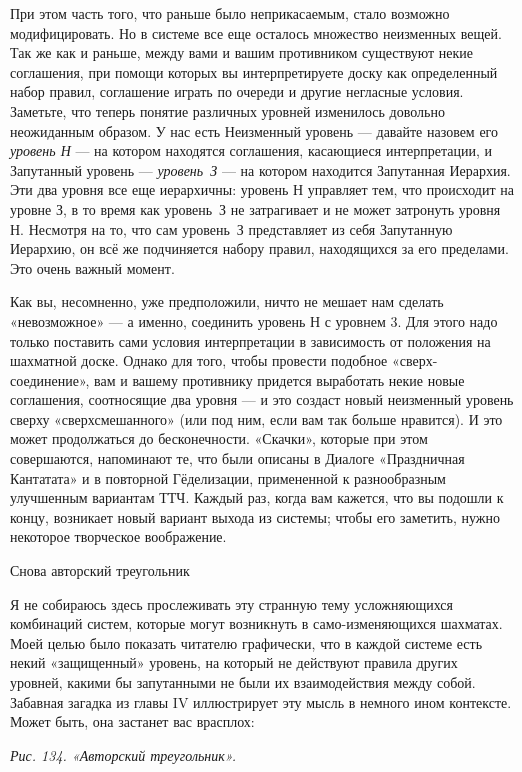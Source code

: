\documentclass[../main.tex]{subfiles}
\begin{document}
При этом часть того, что раньше было неприкасаемым, стало возможно модифицировать. Но в системе все еще осталось множество неизменных вещей. Так же как и раньше, между вами и вашим противником существуют некие соглашения, при помощи которых вы интерпретируете доску как определенный набор правил, соглашение играть по очереди и другие негласные условия. Заметьте, что теперь понятие различных уровней изменилось довольно неожиданным образом. У нас есть Неизменный уровень --- давайте назовем его \emph{уровень Н} --- на котором находятся соглашения, касающиеся интерпретации, и Запутанный уровень --- \emph{уровень~З} --- на котором находится Запутанная Иерархия. Эти два уровня все еще иерархичны: уровень Н управляет тем, что происходит на уровне З, в то время как уровень~З не затрагивает и не может затронуть уровня Н. Несмотря на то, что сам уровень~З представляет из себя Запутанную Иерархию, он всё же подчиняется набору правил, находящихся за его пределами. Это очень важный момент.

Как вы, несомненно, уже предположили, ничто не мешает нам сделать «невозможное» --- а именно, соединить уровень Н с уровнем 3. Для этого надо только поставить сами условия интерпретации в зависимость от положения на шахматной доске. Однако для того, чтобы провести подобное «сверх-соединение», вам и вашему противнику придется выработать некие новые соглашения, соотносящие два уровня --- и это создаст новый неизменный уровень сверху «сверхсмешанного» (или под ним, если вам так больше нравится). И это может продолжаться до бесконечности. «Скачки», которые при этом совершаются, напоминают те, что были описаны в Диалоге «Праздничная Кантатата» и в повторной Гёделизации, примененной к разнообразным улучшенным вариантам ТТЧ. Каждый раз, когда вам кажется, что вы подошли к концу, возникает новый вариант выхода из системы; чтобы его заметить, нужно некоторое творческое воображение.

Снова авторский треугольник

Я не собираюсь здесь прослеживать эту странную тему усложняющихся комбинаций систем, которые могут возникнуть в само-изменяющихся шахматах. Моей целью было показать читателю графически, что в каждой системе есть некий «защищенный» уровень, на который не действуют правила других уровней, какими бы запутанными не были их взаимодействия между собой. Забавная загадка из главы IV иллюстрирует эту мысль в немного ином контексте. Может быть, она застанет вас врасплох:

\emph{Рис. 134. «Авторский треугольник».}
\end{document}
